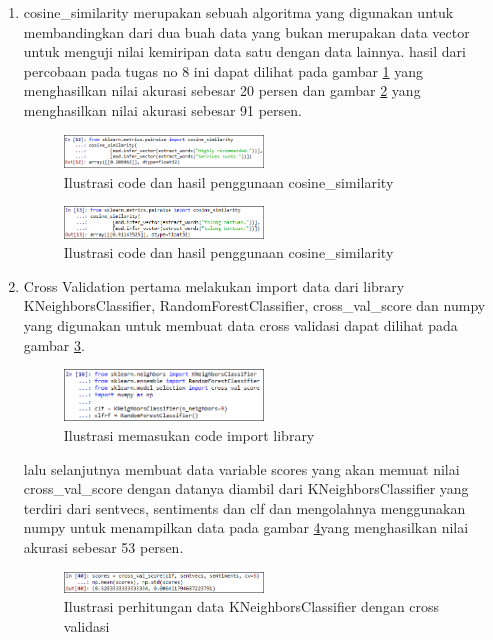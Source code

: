\begin{enumerate}
\item cosine\_similarity
\subitem merupakan sebuah algoritma yang digunakan untuk membandingkan dari dua buah data yang bukan merupakan data vector untuk menguji nilai kemiripan data satu dengan data lainnya. hasil dari percobaan pada tugas no 8 ini dapat dilihat pada gambar \ref{d35} yang menghasilkan nilai akurasi sebesar 20 persen dan gambar \ref{d36} yang menghasilkan nilai akurasi sebesar 91 persen.
\begin{figure}[!htbp]
	\centering
	\includegraphics[width=0.5\textwidth]{figures/fathi/chapter5/hari4/1}
	\caption{Ilustrasi code dan hasil penggunaan cosine\_similarity}
	\label{d35}
\end{figure}

\begin{figure}[!htbp]
	\centering
	\includegraphics[width=0.5\textwidth]{figures/fathi/chapter5/hari4/2}
	\caption{Ilustrasi code dan hasil penggunaan cosine\_similarity}
	\label{d36}
\end{figure}

\item Cross Validation
\subitem pertama melakukan import data dari library KNeighborsClassifier, RandomForestClassifier, cross\_val\_score dan numpy yang digunakan untuk membuat data cross validasi dapat dilihat pada gambar \ref{d37}.
\begin{figure}[!htbp]
	\centering
	\includegraphics[width=0.5\textwidth]{figures/fathi/chapter5/hari4/3}
	\caption{Ilustrasi memasukan code import library}
	\label{d37}
\end{figure}

\subitem lalu selanjutnya membuat data variable scores yang akan memuat nilai cross\_val\_score dengan datanya diambil dari KNeighborsClassifier yang terdiri dari sentvecs, sentiments dan clf dan mengolahnya menggunakan numpy untuk menampilkan data pada gambar \ref{d38}yang menghasilkan nilai akurasi sebesar 53 persen.
\begin{figure}[!htbp]
	\centering
	\includegraphics[width=0.5\textwidth]{figures/fathi/chapter5/hari4/4}
	\caption{Ilustrasi perhitungan data KNeighborsClassifier dengan cross validasi}
	\label{d38}
\end{figure}


\end{enumerate}
